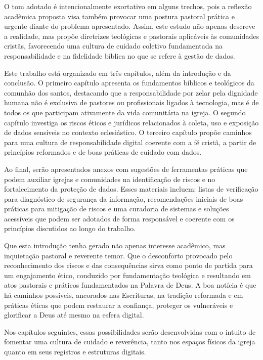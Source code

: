 O tom adotado é intencionalmente exortativo em alguns trechos, pois a reflexão acadêmica proposta visa também provocar uma postura pastoral prática e urgente diante do problema apresentado. Assim, este estudo não apenas descreve a realidade, mas propõe diretrizes teológicas e pastorais aplicáveis às comunidades cristãs, favorecendo uma cultura de cuidado coletivo fundamentada na responsabilidade e na fidelidade bíblica no que se refere à gestão de dados.

Este trabalho está organizado em três capítulos, além da introdução e da conclusão. O primeiro capítulo apresenta os fundamentos bíblicos e teológicos da comunhão dos santos, destacando que a responsabilidade por zelar pela dignidade humana não é exclusiva de pastores ou profissionais ligados à tecnologia, mas é de todos os que participam ativamente da vida comunitária na igreja. O segundo capítulo investiga os riscos éticos e jurídicos relacionados à coleta, uso e exposição de dados sensíveis no contexto eclesiástico. O terceiro capítulo propõe caminhos para uma cultura de responsabilidade digital coerente com a fé cristã, a partir de princípios reformados e de boas práticas de cuidado com dados.

Ao final, serão apresentados anexos com sugestões de ferramentas práticas que podem auxiliar igrejas e comunidades na identificação de riscos e no fortalecimento da proteção de dados. Esses materiais incluem: listas de verificação para diagnóstico de segurança da informação, recomendações iniciais de boas práticas para mitigação de riscos e uma curadoria de sistemas e soluções acessíveis que podem ser adotados de forma responsável e coerente com os princípios discutidos ao longo do trabalho.

Que esta introdução tenha gerado não apenas interesse acadêmico, mas inquietação pastoral e reverente temor. Que o desconforto provocado pelo reconhecimento dos riscos e das consequências sirva como ponto de partida para um engajamento ético, conduzido por fundamentação teológica e resultando em atos pastorais e práticos fundamentados na Palavra de Deus. A boa notícia é que há caminhos possíveis, ancorados nas Escrituras, na tradição reformada e em práticas éticas que podem restaurar a confiança, proteger os vulneráveis e glorificar a Deus até mesmo na esfera digital.

Nos capítulos seguintes, essas possibilidades serão desenvolvidas com o intuito de fomentar uma cultura de cuidado e reverência, tanto nos espaços físicos da igreja quanto em seus registros e estruturas digitais.
